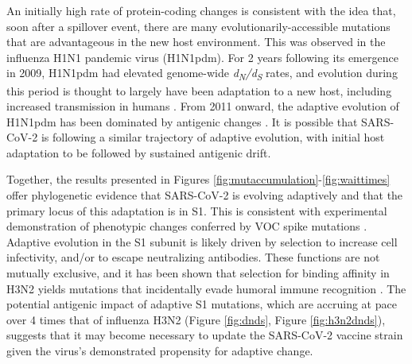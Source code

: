 \documentclass[11pt,oneside,letterpaper]{article}
\begin{document}
An initially high rate of protein-coding changes is consistent with the idea that, soon after a spillover event, there are many evolutionarily-accessible mutations that are advantageous in the new host environment.
This was observed in the influenza H1N1 pandemic virus (H1N1pdm).
For 2 years following its emergence in 2009, H1N1pdm had elevated genome-wide \emph{d\textsubscript{N}/d\textsubscript{S}} rates, and evolution during this period is thought to largely have been adaptation to a new host, including increased transmission in humans \cite{Su2015-az}.
From 2011 onward, the adaptive evolution of H1N1pdm has been dominated by antigenic changes \cite{Su2015-az}.
It is possible that SARS-CoV-2 is following a similar trajectory of adaptive evolution, with initial host adaptation to be followed by sustained antigenic drift.

Together, the results presented in Figures \ref{fig:mutaccumulation}-\ref{fig:waittimes} offer phylogenetic evidence that SARS-CoV-2 is evolving adaptively and that the primary locus of this adaptation is in S1.
This is consistent with experimental demonstration of phenotypic changes conferred by VOC spike mutations \cite{Wang2021-dm, Greaney2021-jn, Li2020-jd, Liu2021-ne}.
Adaptive evolution in the S1 subunit is likely driven by selection to increase cell infectivity, and/or to escape neutralizing antibodies.
These functions are not mutually exclusive, and it has been shown that selection for binding affinity in H3N2 yields mutations that incidentally evade humoral immune recognition \cite{Hensley2009-at}.
The potential antigenic impact of adaptive S1 mutations, which are accruing at pace over 4 times that of influenza H3N2 (Figure \ref{fig:dnds}, Figure \ref{fig:h3n2dnds}), suggests that it may become necessary to update the SARS-CoV-2 vaccine strain given the virus's demonstrated propensity for adaptive change.
\end{document}
